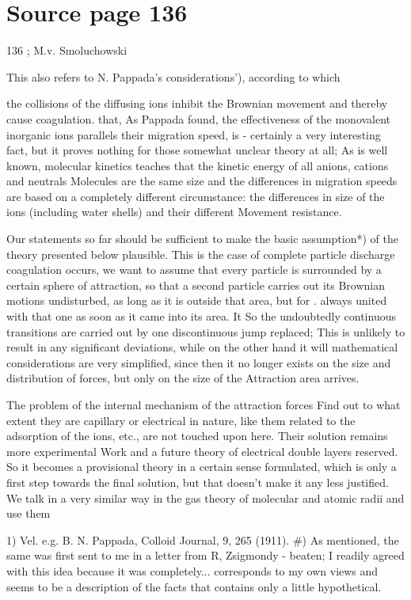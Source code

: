 \documentclass[11pt]{article}
\begin{document}
\section*{Source page 136}
136 ; M.v. Smoluchowski

This also refers to N. Pappada's considerations'), according to which

the collisions of the diffusing ions inhibit the Brownian
movement and thereby cause coagulation. that,
As Pappada found, the effectiveness of the monovalent inorganic ions parallels their migration speed, is -
certainly a very interesting fact, but it proves nothing for those
somewhat unclear theory at all; As is well known, molecular kinetics teaches that the kinetic energy of all anions, cations and neutrals
Molecules are the same size and the differences in migration speeds are based on a completely different circumstance: the differences in size of the ions (including water shells) and their different
Movement resistance.

Our statements so far should be sufficient to make the basic assumption*) of the theory presented below plausible.
This is the case of complete particle discharge
coagulation occurs, we want to assume that every particle is surrounded by a certain sphere of attraction, so that a
second particle carries out its Brownian motions undisturbed,
as long as it is outside that area, but for .
always united with that one as soon as it came into its area. It
So the undoubtedly continuous transitions are carried out by one
discontinuous jump replaced; This is unlikely to result in any significant deviations, while on the other hand it will
mathematical considerations are very simplified, since then it no longer exists
on the size and distribution of forces, but only on the size of the
Attraction area arrives.

The problem of the internal mechanism of the attraction forces
Find out to what extent they are capillary or electrical in nature, like them
related to the adsorption of the ions, etc., are not touched upon here. Their solution remains more experimental
Work and a future theory of electrical double layers
reserved. So it becomes a provisional theory in a certain sense
formulated, which is only a first step towards the final solution,
but that doesn't make it any less justified. We talk in a very similar way
in the gas theory of molecular and atomic radii and use them

1) Vel. e.g. B. N. Pappada, Colloid Journal, 9, 265 (1911).
\#) As mentioned, the same was first sent to me in a letter from R, Zsigmondy
- beaten; I readily agreed with this idea because it was completely...
corresponds to my own views and seems to be a description of the facts that contains only a little hypothetical.
\end{document}
